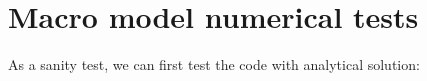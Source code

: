 \documentclass[a4paper,12pt]{article}
\newcommand{\V}[1]{\boldsymbol{#1}}
\newcommand{\grad}[1]{\nabla_{#1}}
\begin{document}


\section{Macro model numerical tests}

As a sanity test, we can first test the code with analytical solution:
\end{document}
